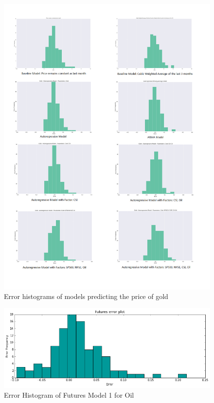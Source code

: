 \documentclass[runningheads]{llncs}
\begin{document}
\begin{figure}
\centering
\includegraphics[width=\textwidth]{GoldErrorHistogram.png}
\caption{Error histograms of models predicting the price of gold}
\label{fig:GoldErrorHistogram.png}
\end{figure}


\begin{figure}
\centering
\includegraphics[width=\textwidth]{futures_oil1.png}
\caption{Error Histogram of Futures Model 1 for Oil}
\label{fig:futures_oil1.png}
\end{figure}
\end{document}
